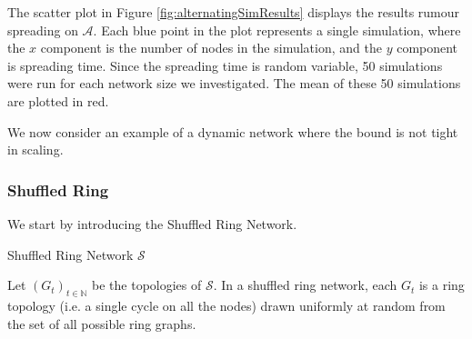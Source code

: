 The scatter plot in Figure \ref{fig:alternatingSimResults} displays the results rumour spreading on $\mathcal{A}$. Each blue point in the plot represents a single simulation, where the $x$ component is the number of nodes in the simulation, and the $y$ component is spreading time. Since the spreading time is random variable, 50 simulations were run for each network size we investigated. The mean of these 50 simulations are plotted in red. %


We now consider an example of a dynamic network where the bound is not tight in scaling. %

\subsubsection{Shuffled Ring}\label{subsect:shuffledRingAsyncApplication}

We start by introducing the Shuffled Ring Network.

\begin{definition}
	Shuffled Ring Network $\mathcal{S}$

	Let $(G_t)_{t \in \mathbb{N}}$ be the topologies of $\mathcal{S}$. In a shuffled ring network, each $G_t$ is a ring topology (i.e. a single cycle on all the nodes) drawn uniformly at random from the set of all possible ring graphs. 
\end{definition}

